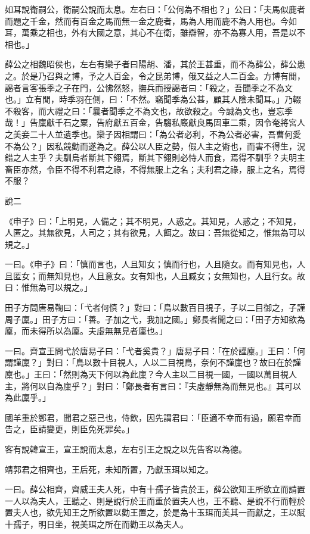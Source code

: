 \begin{pinyinscope}
如耳說衛嗣公，衛嗣公說而太息。左右曰：「公何為不相也？」公曰：「夫馬似鹿者而題之千金，然而有百金之馬而無一金之鹿者，馬為人用而鹿不為人用也。今如耳，萬乘之相也，外有大國之意，其心不在衛，雖辯智，亦不為寡人用，吾是以不相也。」

薛公之相魏昭侯也，左右有欒子者曰陽胡、潘，其於王甚重，而不為薛公，薛公患之。於是乃召與之博，予之人百金，令之昆弟博，俄又益之人二百金。方博有閒，謁者言客張季之子在門，公怫然怒，撫兵而授謁者曰：「殺之，吾聞季之不為文也。」立有閒，時季羽在側，曰：「不然。竊聞季為公甚，顧其人陰未聞耳。」乃輟不殺客，而大禮之曰：「曩者聞季之不為文也，故欲殺之。今誠為文也，豈忘季哉！」告廩獻千石之粟，告府獻五百金，告騶私廄獻良馬固車二乘，因令奄將宮人之美妾二十人並遺季也。欒子因相謂曰：「為公者必利，不為公者必害，吾曹何愛不為公？」因私競勸而遂為之。薛公以人臣之勢，假人主之術也，而害不得生，況錯之人主乎？夫馴烏者斷其下翎焉，斷其下翎則必恃人而食，焉得不馴乎？夫明主畜臣亦然，令臣不得不利君之祿，不得無服上之名；夫利君之祿，服上之名，焉得不服？

說二

《申子》曰：「上明見，人備之；其不明見，人惑之。其知見，人惑之；不知見，人匿之。其無欲見，人司之；其有欲見，人餌之。故曰：吾無從知之，惟無為可以規之。」

一曰。《申子》曰：「慎而言也，人且知女；慎而行也，人且隨女。而有知見也，人且匿女；而無知見也，人且意女。女有知也，人且臧女；女無知也，人且行女。故曰：惟無為可以規之。」

田子方問唐易鞠曰：「弋者何慎？」對曰：「鳥以數百目視子，子以二目御之，子謹周子廩。」田子方曰：「善。子加之弋，我加之國。」鄭長者聞之曰：「田子方知欲為廩，而未得所以為廩。夫虛無無見者廩也。」

一曰。齊宣王問弋於唐易子曰：「弋者奚貴？」唐易子曰：「在於謹廩。」王曰：「何謂謹廩？」對曰：「鳥以數十目視人，人以二目視鳥，奈何不謹廩也？故曰在於謹廩也。」王曰：「然則為天下何以為此廩？今人主以二目視一國，一國以萬目視人主，將何以自為廩乎？」對曰：「鄭長者有言曰：『夫虛靜無為而無見也。』其可以為此廩乎。」

國羊重於鄭君，聞君之惡己也，侍飲，因先謂君曰：「臣適不幸而有過，願君幸而告之，臣請變更，則臣免死罪矣。」

客有說韓宣王，宣王說而太息，左右引王之說之以先告客以為德。

靖郭君之相齊也，王后死，未知所置，乃獻玉珥以知之。

一曰。薛公相齊，齊威王夫人死，中有十孺子皆貴於王，薛公欲知王所欲立而請置一人以為夫人，王聽之、則是說行於王而重於置夫人也，王不聽、是說不行而輕於置夫人也，欲先知王之所欲置以勸王置之，於是為十玉珥而美其一而獻之，王以賦十孺子，明日坐，視美珥之所在而勸王以為夫人。


\end{pinyinscope}
